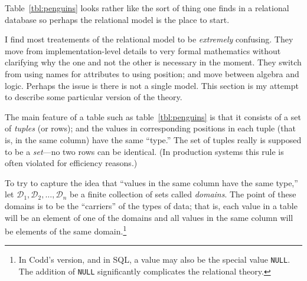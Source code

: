 \documentclass[10pt, a4paper, twocolumn]{article}
\begin{document}
Table~\ref{tbl:penguins} looks rather like the sort of thing one finds in a
relational database so perhaps the relational model is the place to start.

I find most treatements of the relational model to be \emph{extremely}
confusing. They move from implementation-level details to very formal
mathematics without clarifying why the one and not the other is necessary in the
moment. They switch from using names for attributes to using position; and move
between algebra and logic. Perhaps the issue is there is not a single
model. This section is my attempt to describe some particular version of the
theory.

The main feature of a table such as table~\ref{tbl:penguins} is that it consists
of a set of \emph{tuples} (or rows); and the values in corresponding positions
in each tuple (that is, in the same column) have the same ``type.''  The set of
tuples really is supposed to be a \emph{set}---no two rows can be identical. (In
production systems this rule is often violated for efficiency reasons.)

To try to capture the idea that ``values in the same column have the same
type,'' let $\mathscr{D}_1, \mathscr{D}_2, \dots, \mathscr{D}_n$ be a finite
collection of sets called \emph{domains}. The point of these domains is to be
the ``carriers'' of the types of data; that is, each value in a table will be an
element of one of the domains and all values in the same column will be elements
of the same domain.\footnote{In Codd's version, and in SQL, a value may also be
  the special value \texttt{NULL}. The addition of \texttt{NULL} significantly
  complicates the relational theory.}
\end{document}
